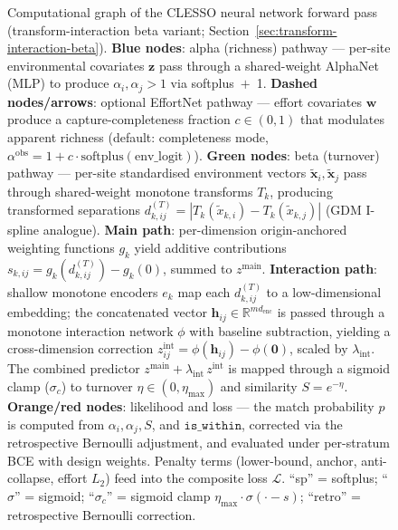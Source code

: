 \documentclass{article}
\begin{document}
\begin{landscape}
\begin{figure}[h]
{\begin{tikzpicture}
\end{tikzpicture}
}%
\caption{%
Computational graph of the CLESSO neural network forward pass (transform-interaction beta variant; Section~\ref{sec:transform-interaction-beta}).
\textbf{Blue nodes}: alpha (richness) pathway --- per-site environmental covariates $\mathbf{z}$ pass through a shared-weight AlphaNet (MLP) to produce $\alpha_i, \alpha_j > 1$ via softplus~$+$~1.
\textbf{Dashed nodes/arrows}: optional EffortNet pathway --- effort covariates $\mathbf{w}$ produce a capture-completeness fraction $c \in (0,1)$ that modulates apparent richness (default: completeness mode, $\alpha^{\mathrm{obs}} = 1 + c\cdot\mathrm{softplus}(\mathrm{env\_logit})$).
\textbf{Green nodes}: beta (turnover) pathway --- per-site standardised environment vectors $\tilde{\mathbf{x}}_i, \tilde{\mathbf{x}}_j$ pass through shared-weight monotone transforms $T_k$, producing transformed separations $d^{(T)}_{k,ij} = |T_k(\tilde{x}_{k,i}) - T_k(\tilde{x}_{k,j})|$ (GDM I-spline analogue). \textbf{Main path}: per-dimension origin-anchored weighting functions $g_k$ yield additive contributions $s_{k,ij} = g_k(d^{(T)}_{k,ij}) - g_k(0)$, summed to $z^{\mathrm{main}}$. \textbf{Interaction path}: shallow monotone encoders $e_k$ map each $d^{(T)}_{k,ij}$ to a low-dimensional embedding; the concatenated vector $\mathbf{h}_{ij} \in \mathbb{R}^{m d_{\mathrm{enc}}}$ is passed through a monotone interaction network $\phi$ with baseline subtraction, yielding a cross-dimension correction $z^{\mathrm{int}}_{ij} = \phi(\mathbf{h}_{ij}) - \phi(\mathbf{0})$, scaled by $\lambda_{\mathrm{int}}$. The combined predictor $z^{\mathrm{main}} + \lambda_{\mathrm{int}}\,z^{\mathrm{int}}$ is mapped through a sigmoid clamp ($\sigma_c$) to turnover $\eta \in (0, \eta_{\max})$ and similarity $S = e^{-\eta}$.
\textbf{Orange/red nodes}: likelihood and loss --- the match probability $p$ is computed from $\alpha_i, \alpha_j, S$, and $\texttt{is\_within}$, corrected via the retrospective Bernoulli adjustment, and evaluated under per-stratum BCE with design weights.  Penalty terms (lower-bound, anchor, anti-collapse, effort $L_2$) feed into the composite loss $\mathcal{L}$.
``sp'' = softplus; ``$\sigma$'' = sigmoid; ``$\sigma_c$'' = sigmoid clamp $\eta_{\max}\cdot\sigma(\cdot - s)$; ``retro'' = retrospective Bernoulli correction.%
}
\label{fig:comp-graph}
\end{figure}
\vspace*{-0.5cm}
\end{landscape}
\end{document}
